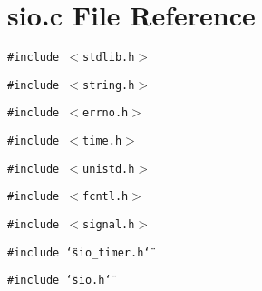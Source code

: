 \section{sio.c File Reference}
\label{sio_8c}
{\tt \#include $<$stdlib.h$>$}\par
{\tt \#include $<$string.h$>$}\par
{\tt \#include $<$errno.h$>$}\par
{\tt \#include $<$time.h$>$}\par
{\tt \#include $<$unistd.h$>$}\par
{\tt \#include $<$fcntl.h$>$}\par
{\tt \#include $<$signal.h$>$}\par
{\tt \#include \char`\"{}sio\_\-timer.h\char`\"{}}\par
{\tt \#include \char`\"{}sio.h\char`\"{}}\par
